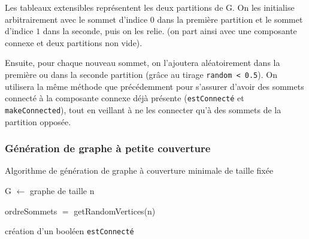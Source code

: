 \documentclass[a4paper,10pt]{article}
\begin{document}
Les tableaux extensibles représentent les deux partitions de G. On les initialise arbitrairement avec le sommet d'indice $0$ dans la première partition et le sommet d'indice $1$ dans la seconde, puis on les relie. (on part ainsi avec une composante connexe et deux partitions non vide).

Ensuite, pour chaque nouveau sommet, on l'ajoutera aléatoirement dans la première ou dans la seconde partition (grâce au tirage \texttt{random < 0.5}). On utilisera la même méthode que précédemment pour s'assurer d'avoir des sommets connecté à la composante connexe déjà présente (\texttt{estConnecté} et \texttt{makeConnected}), tout en veillant à ne les connecter qu'à des sommets de la partition opposée.

\subsubsection{Génération de graphe à petite couverture}

\begin{algorithm}[H]
\caption{Algorithme de génération de graphe à couverture minimale de taille fixée}
\BlankLine
G $\leftarrow$ graphe de taille n

ordreSommets $=$ getRandomVertices(n)


création d'un booléen \texttt{estConnecté}



\end{algorithm}
\bigskip
\end{document}
